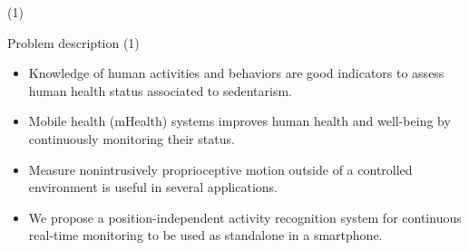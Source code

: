 


\begin{frame}{ \footnotemark (1)}
\begin{block}{Problem description  (1)} 
\begin{itemize}

\item Knowledge of human activities and behaviors are good indicators to assess human health status associated to sedentarism.
\item Mobile health (mHealth) systems improves human health and well-being by
continuously monitoring their status.
\item Measure nonintrusively proprioceptive motion outside of a controlled
environment is useful in several applications.
\item We propose a position-independent activity recognition system for continuous real-time monitoring to be used as standalone in a smartphone.
\end{itemize}
\end{block}
\setcounter{footnote}{0}
\end{frame}




